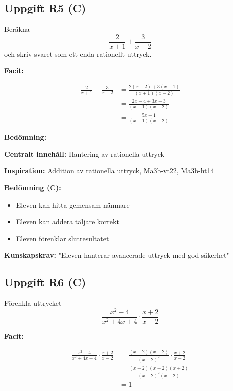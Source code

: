 \documentclass[12pt]{article}
\begin{document}
\subsection*{Uppgift R5 (C)}
Beräkna
\[
\frac{2}{x + 1} + \frac{3}{x - 2}
\]
och skriv svaret som ett enda rationellt uttryck.

\begin{facitbox}
\textbf{Facit:}

\begin{align*}
\frac{2}{x + 1} + \frac{3}{x - 2} &= \frac{2(x - 2) + 3(x + 1)}{(x + 1)(x - 2)} \\
&= \frac{2x - 4 + 3x + 3}{(x + 1)(x - 2)} \\
&= \frac{5x - 1}{(x + 1)(x - 2)}
\end{align*}
\end{facitbox}

\begin{refbox}
\textbf{Bedömning:}

\textbf{Centralt innehåll:} Hantering av rationella uttryck

\textbf{Inspiration:} Addition av rationella uttryck, Ma3b-vt22, Ma3b-ht14

\textbf{Bedömning (C):}
\begin{itemize}
    \item Eleven kan hitta gemensam nämnare
    \item Eleven kan addera täljare korrekt
    \item Eleven förenklar slutresultatet
\end{itemize}

\textbf{Kunskapskrav:} "Eleven hanterar avancerade uttryck med god säkerhet"
\end{refbox}

\subsection*{Uppgift R6 (C)}
Förenkla uttrycket
\[
\frac{x^2 - 4}{x^2 + 4x + 4} \cdot \frac{x + 2}{x - 2}
\]

\begin{facitbox}
\textbf{Facit:}

\begin{align*}
\frac{x^2 - 4}{x^2 + 4x + 4} \cdot \frac{x + 2}{x - 2} &= \frac{(x - 2)(x + 2)}{(x + 2)^2} \cdot \frac{x + 2}{x - 2} \\
&= \frac{(x - 2)(x + 2)(x + 2)}{(x + 2)^2(x - 2)} \\
&= 1
\end{align*}
\end{facitbox}
\end{document}
